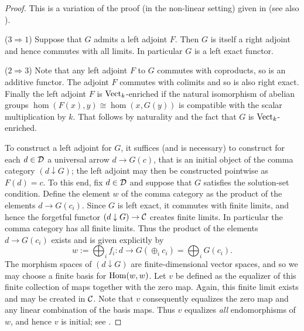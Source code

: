 \documentclass{amsart}
\begin{document}
\begin{proof} This is a variation of the proof (in the non-linear setting) given in \cite[V.6.Thm 2]{MR0354798} (see also \cite[Ex. 3-M]{MR0166240}).

($3 \Rightarrow 1$) Suppose that $G$ admits a left adjoint $F$. Then $G$ is itself a right adjoint and hence commutes with all limits. In particular $G$ is a left exact functor. 

($2 \Rightarrow 3$) Note that any left adjoint $F$ to $G$ commutes with coproducts, so is an additive functor.  The adjoint $F$ commutes with colimits and so is also right exact.  Finally the left adjoint $F$ is ${\mathrm{Vect}_k}$-enriched if the natural isomorphism of abelian groups $\hom( F(x), y) \cong \hom(x, G(y))$ is compatible with the scalar multiplication by $k$. That follows by naturality and the fact that $G$ is ${\mathrm{Vect}_k}$-enriched.


To construct a left adjoint for $G$, it suffices (and is necessary) to construct for each $d \in \mathcal D$ a universal arrow $d \to G(c)$, that is an initial object of the comma category $(d \downarrow G)$; the left adjoint may then be constructed pointwise as $F(d) = c$. To this end, fix $d \in \mathcal D$ and suppose that $G$ satisfies the solution-set condition. Define the element $w$ of the comma category as the product of the elements $d \to G(c_i)$. Since $G$ is left exact, it commutes with finite limits, and hence the forgetful functor $(d \downarrow G) \to \mathcal C$ creates finite limits. In particular the comma category has all finite limits.  Thus the product of the elements $d \rightarrow G(c_i)$ exists and is given explicitly by
\begin{equation*}
	w := \bigoplus_i f_i :  d \to G( \oplus_i c_i) = \bigoplus_i G(c_i).
\end{equation*}
The morphism spaces of $(d \downarrow G)$ are finite-dimensional vector spaces, and so we may choose a finite basis for $\operatorname{Hom}(w,w)$. Let $v$ be defined as the equalizer of this finite collection of maps together with the zero map. Again, this finite limit exists and may be created in $\mathcal C$. Note that $v$ consequently equalizes the zero map and any linear combination of the basis maps. Thus $v$ equalizes {\em all} endomorphisms of $w$, and hence $v$ is initial; see  \cite[V.6.Thm 1]{MR0354798}.  


\end{proof}
\end{document}
